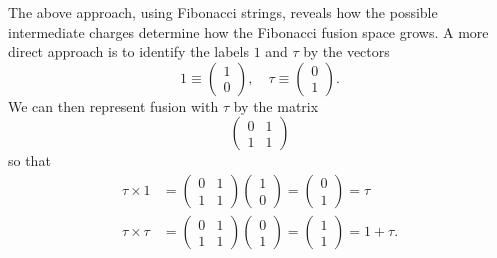 \documentclass[a4paper,10pt,oneside]{book}
\theoremstyle{plain}
\theoremstyle{definition}
\theoremstyle{remark}
\begin{document}
The above approach, using Fibonacci strings, reveals how the possible intermediate charges determine how the Fibonacci fusion space grows. A more direct approach is to identify the labels $1$ and $\tau$ by the vectors
\begin{equation}
  1 \equiv \begin{pmatrix}1\\0\end{pmatrix}, \quad
  \tau \equiv \begin{pmatrix}0\\1\end{pmatrix}.
\end{equation}
We can then represent fusion with $\tau$ by the matrix
\begin{equation}
  \begin{pmatrix}
    0 & 1 \\
    1 & 1
  \end{pmatrix}
\end{equation}
so that
\begin{equation}
  \begin{aligned}
    \tau \times 1 &=
    \begin{pmatrix}
      0 & 1 \\
      1 & 1
    \end{pmatrix}
    \begin{pmatrix}
      1 \\ 0
    \end{pmatrix} =
    \begin{pmatrix}
      0 \\ 1
    \end{pmatrix}
    = \tau
    \\
    \tau \times \tau &=
    \begin{pmatrix}
      0 & 1 \\
      1 & 1
    \end{pmatrix}
    \begin{pmatrix}
      0 \\ 1
    \end{pmatrix} =
    \begin{pmatrix}
      1 \\ 1
    \end{pmatrix}
    = 1 + \tau.
  \end{aligned}
\end{equation}
\end{document}
